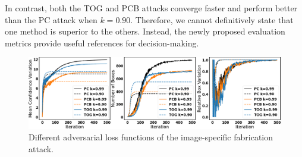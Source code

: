 In contrast, both the TOG and PCB attacks converge faster and perform better than the PC attack when $k=0.90$. Therefore, we cannot definitively state that one method is superior to the others. Instead, the newly proposed evaluation metrics provide useful references for decision-making.


\begin{figure}[H]
    \centering
    \includegraphics[width=\linewidth]{figures/chapter_detection/hardware/loss.png}
    \caption{Different adversarial loss functions of the  image-specific  fabrication attack.}
    \label{fig:loss}
\end{figure}

